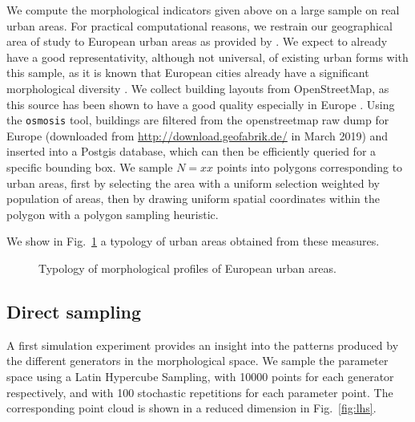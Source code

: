 \documentclass[letterpaper]{article}
\begin{document}
We compute the morphological indicators given above on a large sample on real urban areas. For practical computational reasons, we restrain our geographical area of study to European urban areas as provided by \cite{}. We expect to already have a good representativity, although not universal, of existing urban forms with this sample, as it is known that European cities already have a significant morphological diversity \citep{le2015forme}. We collect building layouts from OpenStreetMap, as this source has been shown to have a good quality especially in Europe \citep{mooney2010towards}. Using the \texttt{osmosis} tool, buildings are filtered from the openstreetmap raw dump for Europe (downloaded from \url{http://download.geofabrik.de/} in March 2019) and inserted into a Postgis database, which can then be efficiently queried for a specific bounding box.
We sample $N=xx$ points into polygons corresponding to urban areas, first by selecting the area with a uniform selection weighted by population of areas, then by drawing uniform spatial coordinates within the polygon with a polygon sampling heuristic. %





We show in Fig.~\ref{fig:realtypology} a typology of urban areas obtained from these measures.

\begin{figure}
    \centering
    \caption{Typology of morphological profiles of European urban areas.}
    \label{fig:realtypology}
\end{figure}




\subsection{Direct sampling}

A first simulation experiment provides an insight into the patterns produced by the different generators in the morphological space. We sample the parameter space using a Latin Hypercube Sampling, with 10000 points for each generator respectively, and with 100 stochastic repetitions for each parameter point. The corresponding point cloud is shown in a reduced dimension in Fig.~\ref{fig:lhs}.
\end{document}
